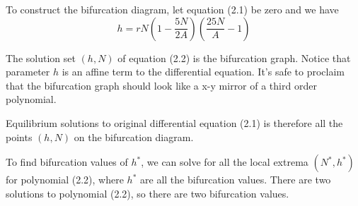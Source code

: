 \documentclass{amsart}
\theoremstyle{definition}
\theoremstyle{remark}
\numberwithin{equation}{section}
\begin{document}
To construct the bifurcation diagram, let equation (2.1) be zero and we have
\begin{equation}
    h=rN(1-\frac{5N}{2A})(\frac{25N}{A}-1)
\end{equation}

The solution set ${(h,N)}$ of equation (2.2) is the bifurcation graph. Notice that parameter $h$ is an affine term to the differential equation. It's safe to proclaim that the bifurcation graph should look like a x-y mirror of a third order polynomial.

Equilibrium solutions to original differential equation (2.1) is therefore all the points $(h,N)$ on the bifurcation diagram.

To find bifurcation values of $h^*$, we can solve for all the local extrema $(N^*,h^*)$ for polynomial (2.2), where $h^*$ are all the bifurcation values. There are two solutions to polynomial (2.2), so there are two bifurcation values.
\end{document}
